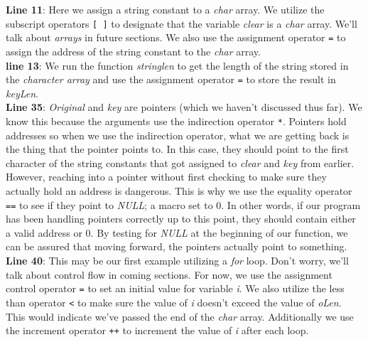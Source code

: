 \documentclass[../main.tex]{subfiles}
\begin{document}
	\textbf{Line 11}: Here we assign a string constant to a \textit{char} array.  We utilize the subscript operators \texttt{[ ]} to designate that the variable \textit{clear} is a \textit{char} array.  We'll talk about \textit{arrays} in future sections.  We also use the assignment operator \texttt{=} to assign the address of the string constant to the \textit{char} array.\\
	\textbf{line 13}: We run the function \textit{stringlen} to get the length of the string stored in the \textit{character array} and use the assignment operator \texttt{=} to store the result in \textit{keyLen}.\\
	\textbf{Line 35}: \textit{Original} and \textit{key} are pointers (which we haven't discussed thus far).  We know this because the arguments use the indirection operator \texttt{*}.  Pointers hold addresses so when we use the indirection operator, what we are getting back is the thing that the pointer points to.  In this case, they should point to the first character of the string constants that got assigned to \textit{clear} and \textit{key} from earlier.  However, reaching into a pointer without first checking to make sure they actually hold an address is dangerous.  This is why we use the equality operator \texttt{==} to see if they point to \textit{NULL}; a macro set to 0.  In other words, if our program has been handling pointers correctly up to this point, they should contain either a valid address or 0.  By testing for \textit{NULL} at the beginning of our function, we can be assured that moving forward, the pointers actually point to something.\\
	\textbf{Line 40}: This may be our first example utilizing a \textit{for} loop.  Don't worry, we'll talk about control flow in coming sections.  For now, we use the assignment control operator \texttt{=} to set an initial value for variable \textit{i}.  We also utilize the less than operator \texttt{<} to make sure the value of \textit{i} doesn't exceed the value of \textit{oLen}.  This would indicate we've passed the end of the \textit{char} array.  Additionally we use the increment operator \texttt{++} to increment the value of \textit{i} after each loop.\\
\end{document}

